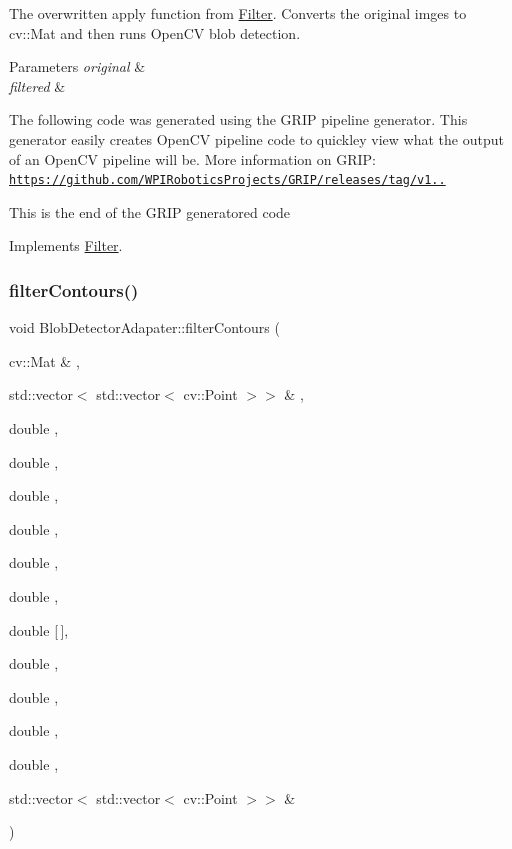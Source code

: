 The overwritten apply function from \hyperlink{classFilter}{Filter}. Converts the original imges to cv\+::\+Mat and then runs Open\+CV blob detection. 


\begin{DoxyParams}{Parameters}
{\em original} & \\
\hline
{\em filtered} & \\
\hline
\end{DoxyParams}
The following code was generated using the G\+R\+IP pipeline generator. This generator easily creates Open\+CV pipeline code to quickley view what the output of an Open\+CV pipeline will be. More information on G\+R\+IP\+: \href{https://github.com/WPIRoboticsProjects/GRIP/releases/tag/v1.5.2}{\tt https\+://github.\+com/\+W\+P\+I\+Robotics\+Projects/\+G\+R\+I\+P/releases/tag/v1..}

This is the end of the G\+R\+IP generatored code

Implements \hyperlink{classFilter_afab0d50af44a19a370ebe46c69b8ff4e}{Filter}.

\mbox{\label{classBlobDetectorAdapater_a5a627a8ae0ac83881e70ee096c69bdbd}} 
\subsubsection{\texorpdfstring{filter\+Contours()}{filterContours()}}
{\footnotesize\ttfamily void Blob\+Detector\+Adapater\+::filter\+Contours (\begin{DoxyParamCaption}\item[{cv\+::\+Mat \&}]{,  }\item[{std\+::vector$<$ std\+::vector$<$ cv\+::\+Point $>$$>$ \&}]{,  }\item[{double}]{,  }\item[{double}]{,  }\item[{double}]{,  }\item[{double}]{,  }\item[{double}]{,  }\item[{double}]{,  }\item[{double}]{\mbox{[}$\,$\mbox{]},  }\item[{double}]{,  }\item[{double}]{,  }\item[{double}]{,  }\item[{double}]{,  }\item[{std\+::vector$<$ std\+::vector$<$ cv\+::\+Point $>$$>$ \&}]{ }\end{DoxyParamCaption})\hspace{0.3cm}{\ttfamily [private]}}



